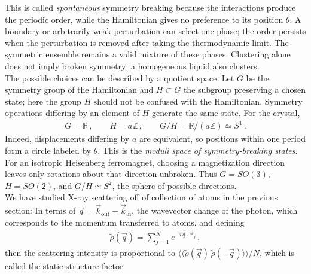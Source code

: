 \documentclass[11pt, oneside]{book}
\theoremstyle{break}
\theoremstyle{break}
\newcommand{\R}{\mathbb{R}}
\newcommand{\Z}{\mathbb{Z}}
\newcommand{\that}[1]{\widetilde{#1}}
\begin{document}
This is called \textit{spontaneous} symmetry breaking because the interactions produce the periodic order, while the Hamiltonian gives no preference to its position $\theta$. A boundary or arbitrarily weak perturbation can select one phase; the order persists when the perturbation is removed after taking the thermodynamic limit. The symmetric ensemble remains a valid mixture of these phases. Clustering alone does not imply broken symmetry: a homogeneous liquid also clusters.\\

The possible choices can be described by a quotient space. Let $G$ be the symmetry group of the Hamiltonian and $H\subset G$ the subgroup preserving a chosen state; here the group $H$ should not be confused with the Hamiltonian. Symmetry operations differing by an element of $H$ generate the same state. For the crystal,
\begin{align*}
G=\R\,,\qquad H=a\Z\,,\qquad G/H=\R/(a\Z)\simeq S^1\,.
\end{align*}
Indeed, displacements differing by $a$ are equivalent, so positions within one period form a circle labeled by $\theta$. This is the \textit{moduli space of symmetry-breaking states}. For an isotropic Heisenberg ferromagnet, choosing a magnetization direction leaves only rotations about that direction unbroken. Thus $G=SO(3)$, $H=SO(2)$, and $G/H\simeq S^2$, the sphere of possible directions.\\




\newpage
We have studied X-ray scattering off of collection of atoms in the previous section: In terms of $\vec{q}=\vec{k}_{\text{out}}-\vec{k}_{\text{in}}$, the wavevector change of the photon, which corresponds to the momentum transferred to atoms, and defining
\begin{align*}
\that{\rho}(\vec{q}) = \sum_{j=1}^N e^{-i\vec{q}\cdot \vec{r}_j}\,,
\end{align*}
then the scattering intensity is proportional to $\langle\langle \that{\rho}(\vec{q}) \, \that{\rho}(-\vec{q}) \rangle\rangle/N$, which is called the static structure factor. \\
\end{document}
